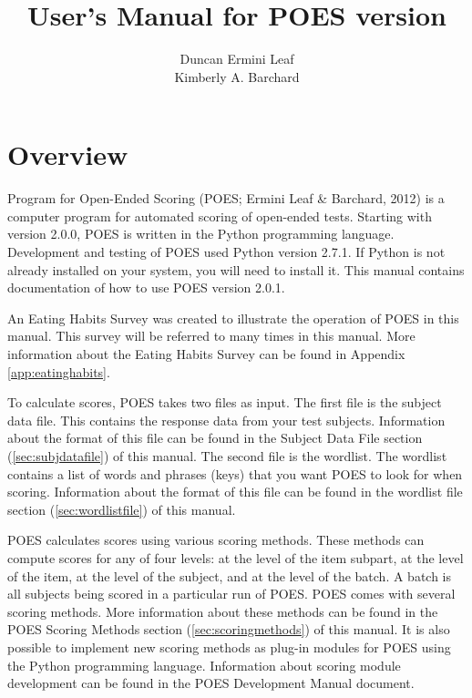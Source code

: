\documentclass[11pt]{article}
\title{User's Manual for POES version \poesver}
\author{Duncan Ermini Leaf\\
Kimberly A. Barchard
}
\newcommand{\poesver}{2.0.1}
\numberwithin{figure}{section}
\numberwithin{table}{section}
\begin{document}
\maketitle

\tableofcontents
\newpage



\section{Overview}

Program for Open-Ended Scoring (POES; Ermini Leaf \& Barchard, 2012) is a computer program for automated scoring of open-ended tests. Starting with version 2.0.0, POES is written in the Python programming language. Development and testing of POES used Python version 2.7.1.  If Python is not already installed on your system, you will need to install it.
This manual contains documentation of how to use POES version \poesver.

An Eating Habits Survey was created to illustrate the operation of POES in this manual.  This survey will be referred to many times in this manual.  More information about the Eating Habits Survey can be found in Appendix \ref{app:eatinghabits}.

To calculate scores, POES takes two files as input.  The first file is the subject data file.  This contains the response data from your test subjects.  Information about the format of this file can be found in the Subject Data File section (\ref{sec:subjdatafile}) of this manual.  The second file is the wordlist.  The wordlist contains a list of words and phrases (keys) that you want POES to look for when scoring.  Information about the format of this file can be found in the wordlist file section (\ref{sec:wordlistfile}) of this manual.

POES calculates scores using various scoring methods.  These methods can compute scores for any of four levels: at the level of the item subpart, at the level of the item, at the level of the subject, and at the level of the batch.  A batch is all subjects being scored in a particular run of POES.  
POES comes with several scoring methods.  More information about these methods can be found in the POES Scoring Methods section (\ref{sec:scoringmethods}) of this manual.  It is also possible to implement new scoring methods as plug-in modules for POES using the Python programming language.  Information about scoring module development can be found in the POES Development Manual document.
\end{document}
